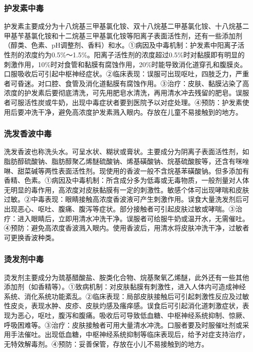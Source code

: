 \subsubsection{护发素中毒}

护发素主要成分为十八烷基三甲基氯化铵、双十八烷基二甲基氯化铵、十八烷基二甲基苄基氯化铵和十二烷基三甲基氯化铵等阳离子表面活性剂，还有一些添加剂（醇类、色素、pH调整剂、香料）和水。①病因及中毒机制：护发素中阳离子活性剂的浓度约为0.5\%～1.5\%。阳离子活性剂的浓度超过0.5\%时对黏膜即有明显的刺激作用，10\%时对食管和黏膜有腐蚀作用，20\%时能导致消化道穿孔和腹膜炎。口服吸收后可引起中枢神经症状。②临床表现：误服可出现呕吐，四肢乏力，严重者可昏迷。对口腔、食管及消化道黏膜有腐蚀作用。③治疗：皮肤、黏膜沾染了高浓度的护发素后要彻底清洗，可先用肥皂水清洗，再用清水冲去残留的肥皂。误服者可服活性炭或牛奶，出现中毒症状者要到医院予以对症处理。④预防：护发素使用后要冲洗干净，避免高浓度护发素溅入眼内。存放在儿童不易接触到的地方。

\subsubsection{洗发香波中毒}

洗发香波也称洗头水。可呈水状、糊状或膏状。主要成分为阴离子表面活性剂，如脂肪醇硫酸钠、脂肪醇聚乙烯醚硫酸钠、烯基磺酸钠、烷基硫酸胺等，还含有咪唑啉、甜菜碱等两性表面活性剂。现使用的香波一般不含烷基苯磺酸钠。但多添加有香精、色素。①病因及中毒机制：所含成分多为低毒或无毒物质，一般剂量对人体无明显的毒作用，高浓度对皮肤黏膜有一定的刺激性。敏感个体可出现哮喘和皮肤过敏。②中毒表现：眼睛接触高浓度香波液可产生刺激作用。误食大量洗发剂后可出现恶心、呕吐、腹痛、腹泻等症状。部分接触者可引起皮肤过敏或哮喘。③治疗：进入眼睛后，立即用清水冲洗干净。误服者可给服牛奶或温开水，无需催吐。④预防：避免高浓度香波溅入眼内。使用香波后，用清水将皮肤冲洗干净，过敏者可更换香波种类。

\subsubsection{烫发剂中毒}

烫发剂主要成分为巯基醋酸盐、胺类化合物、烷基聚氧乙烯醚，此外还有一些其他添加剂（如香精等）。①致病机制：对皮肤黏膜有刺激性，进入人体内可造成神经系统、消化系统功能紊乱。②临床表现：局部皮肤接触后可引起刺激性反应及过敏性皮炎，表现水肿、皮疹、皮肤灼感及瘙痒感。误食后可引起消化道刺激症状，表现为恶心，呕吐，腹泻和腹痛。吸收后可导致低血糖、中枢神经系统抑制、惊厥、呼吸困难等。③治疗：皮肤接触者可用大量清水冲洗。口服者要及时服催吐剂或采用手法催吐。出现低血糖，中枢神经系统抑制等临床表现后，给予对症支持治疗，无特效解毒剂。④预防：妥善保管，存放在小儿不易接触到的地方。

